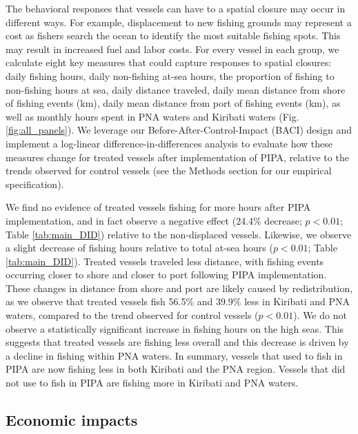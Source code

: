 \documentclass[9p,twocolumn,twoside,lineno]{pnas-new}
\begin{document}
The behavioral responses that vessels can have to a spatial closure may occur in different ways. For example, displacement to new fishing grounds may represent a cost as fishers search the ocean to identify the most suitable fishing spots. This may result in increased fuel and labor costs. For every vessel in each group, we calculate eight key measures that could capture responses to spatial closures: daily fishing hours, daily non-fishing at-sea hours, the proportion of fishing to non-fishing hours at sea, daily distance traveled, daily mean distance from shore of fishing events (km), daily mean distance from port of fishing events (km), as well as monthly hours spent in PNA waters and Kiribati waters (Fig. \ref{fig:all_panels}). We leverage our Before-After-Control-Impact (BACI) design and implement a log-linear difference-in-differences analysis to evaluate how these measures change for treated vessels after implementation of PIPA, relative to the trends observed for control vessels (see the Methods section for our empirical specification).

We find no evidence of treated vessels fishing for more hours after PIPA implementation, and in fact observe a negative effect (24.4\% decrease; $p < 0.01$; Table \ref{tab:main_DID}) relative to the non-displaced vessels. Likewise, we observe a slight decrease of fishing hours relative to total at-sea hours ($p < 0.01$; Table \ref{tab:main_DID}). Treated vessels traveled less distance, with fishing events occurring closer to shore and closer to port following PIPA implementation. These changes in distance from shore and port are likely caused by redistribution, as we observe that treated vessels fish 56.5\% and 39.9\% less in Kiribati and PNA waters, compared to the trend observed for control vessels ($p < 0.01$). We do not observe a statistically significant increase in fishing hours on the high seas. This suggests that treated vessels are fishing less overall and this decrease is driven by a decline in fishing within PNA waters. In summary, vessels that used to fish in PIPA are now fishing less in both Kiribati and the PNA region. Vessels that did not use to fish in PIPA are fishing more in Kiribati and PNA waters.

\subsection{Economic impacts}
\end{document}

